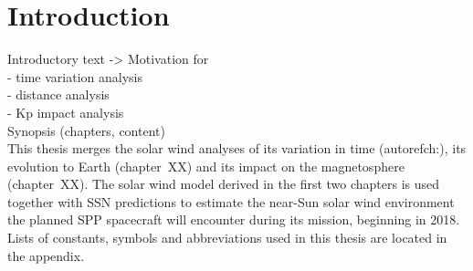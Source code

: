 
\chapter{Introduction}
\label{chap:introduction}

Introductory text -> Motivation for\\
- time variation analysis\\
- distance analysis\\
- Kp impact analysis\\



Synopsis (chapters, content)\\	%
This thesis merges the solar wind analyses of its variation in time (autoref{ch:}), its evolution to Earth (chapter~XX) and its impact on the magnetosphere (chapter~XX). The solar wind model derived in the first two chapters is used together with SSN predictions to estimate the near-Sun solar wind environment the planned SPP spacecraft will encounter during its mission, beginning in 2018. Lists of constants, symbols and abbreviations used in this thesis are located in the appendix.\\


